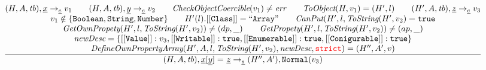 \documentclass[a4paper, leqno]{amsart}
\newcommand{\rulesep}{\quad\quad}
\newcommand{\stmt}{s}
\newcommand{\expr}{e}
\newcommand{\ir}[1]{\ensuremath{\underline{#1}}}
\newcommand{\irid}{\ir{x}}
\def\inred{\color{red}}
\newcommand{\strict}{{\inred\tt strict}}
\newcommand{\true}{{\tt true}}
\newcommand{\tb}{\emph{tb}}
\newcommand{\err}{\emph{err}}
\newcommand{\hf}[1]{\emph{#1}}
\newcommand{\state}{\ensuremath{(H,A,\tb)}}
\newcommand{\evale}{\ensuremath{(H,A,\tb)}}
\def\inred{\color{red}}
\begin{document}
\[\begin{array}{l@{~~}l@{~~}ll}
\frac{\begin{matrix}
\evale, \irid \rightarrow_{\ir\expr} v_1
\rulesep
\evale, \ir{y} \rightarrow_{\ir\expr} v_2
\rulesep
\hf{CheckObjectCoercible}(v_1) \not= \err
\rulesep
\hf{ToObject}(H, v_1) = (H',l)
\rulesep
(H', A, \tb), \ir{z} \rightarrow_{\ir\expr} v_3
\\
v_1 \notin \{{\tt Boolean, String, Number}\}
\rulesep
H'(l).[[{\tt Class}]] = {\tt``Array"}%
\rulesep
\hf{CanPut}(H', l, \hf{ToString}(H', v_2) = \true
\\
\hf{GetOwnPropety}(H', l,\hf{ToString}(H', v_2)) \not= (dp, \_)
\rulesep
\hf{GetPropety}(H', l,\hf{ToString}(H', v_2)) \not= (ap, \_)
\\
\hf{newDesc} = \{[[{\tt Value}]]:v_3, {\tt[[Writable]]}:\true,  [[{\tt Enumerable}]]:\true,  [[{\tt Conigurable}]]:\true \}
\\
\hf{DefineOwnPropertyArray}(H', A, l, \hf{ToString}(H', v_2), \hf{newDesc}, \strict) = (H'', A', v)
\end{matrix}}{\begin{matrix}
\state, \irid{\tt[}\ir{y}{\tt] =} \ \ir{z} \rightarrow_{\ir\stmt}
(H'',A'), {\tt Normal}(v_3)
\end{matrix}}
\\[2em]




\end{array}\]
\end{document}
